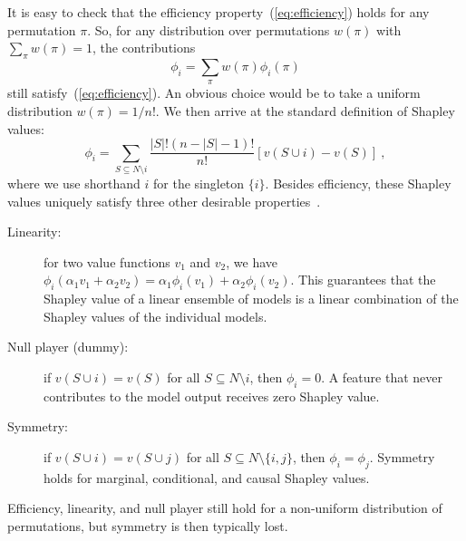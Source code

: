 \documentclass{article}
\newcommand{\vX}{\mathbf{X}}
\newcommand{\vx}{\mathbf{x}}
\newcommand{\expectation}{\mathbb{E}}
\newcommand{\contribution}{{\phi}}
\newcommand{\val}{{v}}
\newcommand{\perm}{\pi}
\newcommand{\operator}{\mathit{op}}
\newcommand{\svop}[1]{\operator(\vx_{#1})}
\newcommand{\allfeatures}{{N}}
\begin{document}
It is easy to check that the efficiency property~(\ref{eq:efficiency}) holds for any permutation $\perm$.
So, for any distribution over permutations $w(\perm)$ with $\sum_{\perm} w(\perm) = 1$, the contributions
\[
\contribution_i = \sum_{\perm} w(\perm) \contribution_i(\perm)
\]
still satisfy~(\ref{eq:efficiency}). An obvious choice would be to take a uniform distribution $w(\perm) = 1/n!$. We then arrive at the standard definition of Shapley values:
\[
\contribution_i = \sum_{S \subseteq \allfeatures\setminus i} \frac{|S|! (n-|S|-1)!}{n!} \left[\val(S \cup i) - \val(S) \right] \: ,
\]
where we use shorthand $i$ for the singleton $\{i\}$. Besides efficiency, these Shapley values uniquely satisfy three other desirable properties~\cite{shapley1953value}.
\begin{description}
	\item[Linearity:] for two value functions $\val_1$ and $\val_2$, we have $\contribution_i(\alpha_1 \val_1 + \alpha_2 \val_2) = \alpha_1 \contribution_i(\val_1) + \alpha_2 \contribution_i(\val_2)$. This guarantees that the Shapley value of a linear ensemble of models is a linear combination of the Shapley values of the individual models.
	\item[Null player (dummy):] if $\val(S \cup i) = \val(S)$ for all $S \subseteq \allfeatures \setminus i$, then $\contribution_i = 0$. A feature that never contributes to the model output receives zero Shapley value.
	\item[Symmetry:] if $\val(S \cup i) = \val(S \cup j)$ for all  $S \subseteq \allfeatures \setminus \{i,j\}$, then $\contribution_i = \contribution_j$. Symmetry holds for marginal, conditional, and causal Shapley values.
\end{description}
Efficiency, linearity, and null player still hold for a non-uniform distribution of permutations, but symmetry is then typically lost. 
\end{document}
